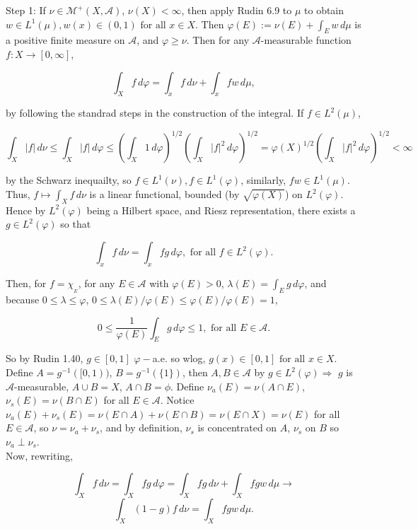 \documentclass[12pt]{article}
\newcommand{\fall}[0] { \textrm{ for all } }
\newcommand{\A}[0] { \mathcal{A} }
\newcommand{\M}[0] { \mathcal{M} }
\newcommand{\rimply}[0] { \Rightarrow }
\newcommand{\rarw}[0] { \rightarrow }
\begin{document}
\noindent
Step 1: If $\nu \in \M^+(X, \A)$,  $\nu(X) < \infty$, then apply Rudin 6.9 to $\mu$ to obtain $w \in L^1(\mu), w(x) \in (0,1) \fall x \in X$. Then $\varphi(E) := \nu(E) + \int_E w \, d\mu$ is a positive finite measure on $\A$, and $\varphi \ge \nu$. Then for any $\A$-measurable function $f:X \rarw [0, \infty]$,

$$
\int_X f \, d\varphi = \int_x f \, d\nu + \int_x f w \, d\mu,
$$

\noindent
by following the standrad steps in the construction of the integral. If $f \in L^2(\mu)$,


$$
\int_X |f| \, d\nu  \le  \int_X |f| \, d\varphi \le \left( \int_X 1 \, d\varphi \right)^{1/2} \left( \int_X |f|^2 \, d\varphi \right)^{1/2}   = \varphi(X)^{1/2} \left( \int_X |f|^2 \, d\varphi \right)^{1/2} < \infty
$$

\noindent
by the Schwarz inequailty, so $f \in L^1(\nu), f \in L^1(\varphi)$, similarly, $fw \in L^1(\mu)$. Thus, $f \mapsto \int_X f \, d\nu$ is a linear functional, bounded (by $\sqrt{\varphi(X)}$)  on $L^2(\varphi)$. Hence by $L^2(\varphi)$ being a Hilbert space, and Riesz representation, there exists a $g \in L^2(\varphi)$ so that

$$
\int_x f \, d\nu = \int_x fg \, d\varphi, \fall f \in L^2(\varphi).
$$


\noindent
Then, for $f = \chi_{_E}$, for any $E \in \A$ with $\varphi(E) > 0$, $\lambda(E) = \int_E g \, d\varphi$, and because $ 0 \le \lambda \le \varphi$, $ 0 \le \lambda(E) / \varphi(E) \le \varphi(E)  / \varphi(E) = 1$,

$$
0 \le \frac{1}{\varphi(E)} \int_E g \, d\varphi \le 1, \fall E \in \A.
$$

\noindent
So by Rudin 1.40, $g \in [0,1]$ $\varphi-$a.e. so wlog, $g(x) \in [0,1] \fall x \in X$. \\

\noindent
Define $A = g^{-1} ([0,1))$, $B = g^{-1}( \{ 1 \})$, then $A,B \in \A$ by $g \in L^2(\varphi) \rimply$ $g$ is $\A$-measurable, $A \cup B = X$, $A \cap B = \phi$. Define $\nu_a(E) = \nu(A \cap E)$, $\nu_s(E) = \nu(B \cap E)$ for all $E \in \A$. Notice $\nu_a(E) + \nu_s(E) = \nu(E \cap A) + \nu(E \cap B) = \nu(E \cap X) = \nu(E)$ for all $E \in \A$, so $\nu = \nu_a +\nu_s$, and by definition, $\nu_s$ is concentrated on $A$, $\nu_s$ on $B$ so $\nu_a \perp \nu_s$. \\


\noindent
Now, rewriting,

$$
\int_X f \, d\nu = \int_X fg \, d\varphi =  \int_X  fg \, d\nu  +  \int_X  fgw \, d\mu \rarw 
$$
$$
 \int_X (1-g) f \, d\nu = \int_X fgw \, d\mu.
$$
\end{document}
